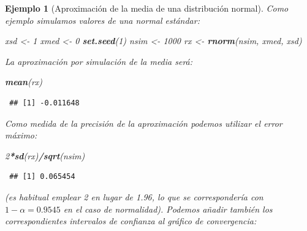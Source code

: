 \documentclass[
  spanish,
  10pt,
]{book}
\newenvironment{Shaded}{\begin{snugshade}}{\end{snugshade}}
\newcommand{\DecValTok}[1]{\textcolor[rgb]{0.00,0.00,0.81}{#1}}
\newcommand{\FunctionTok}[1]{\textcolor[rgb]{0.13,0.29,0.53}{\textbf{#1}}}
\newcommand{\NormalTok}[1]{#1}
\newcommand{\OtherTok}[1]{\textcolor[rgb]{0.56,0.35,0.01}{#1}}
\newcommand{\SpecialCharTok}[1]{\textcolor[rgb]{0.81,0.36,0.00}{\textbf{#1}}}
\theoremstyle{break}
\newtheorem{example}{Ejemplo}[chapter]
\theoremstyle{nonumberplain}
\begin{document}
\begin{example}[Aproximación de la media de una distribución normal]

Como ejemplo simulamos valores de una normal estándar:

\begin{Shaded}
\begin{Highlighting}[]
\NormalTok{xsd }\OtherTok{\textless{}{-}} \DecValTok{1}
\NormalTok{xmed }\OtherTok{\textless{}{-}} \DecValTok{0}
\FunctionTok{set.seed}\NormalTok{(}\DecValTok{1}\NormalTok{)}
\NormalTok{nsim }\OtherTok{\textless{}{-}} \DecValTok{1000}
\NormalTok{rx }\OtherTok{\textless{}{-}} \FunctionTok{rnorm}\NormalTok{(nsim, xmed, xsd)}
\end{Highlighting}
\end{Shaded}

La aproximación por simulación de la media será:

\begin{Shaded}
\begin{Highlighting}[]
\FunctionTok{mean}\NormalTok{(rx)}
\end{Highlighting}
\end{Shaded}

\begin{verbatim}
 ## [1] -0.011648
\end{verbatim}

Como medida de la precisión de la aproximación podemos utilizar el error máximo:

\begin{Shaded}
\begin{Highlighting}[]
\DecValTok{2}\SpecialCharTok{*}\FunctionTok{sd}\NormalTok{(rx)}\SpecialCharTok{/}\FunctionTok{sqrt}\NormalTok{(nsim)}
\end{Highlighting}
\end{Shaded}

\begin{verbatim}
 ## [1] 0.065454
\end{verbatim}

(es habitual emplear 2 en lugar de 1.96,
lo que se correspondería con \(1 - \alpha = 0.9545\) en el caso de normalidad).
Podemos añadir también los correspondientes intervalos de confianza al gráfico de convergencia:


\end{example}
\end{document}
